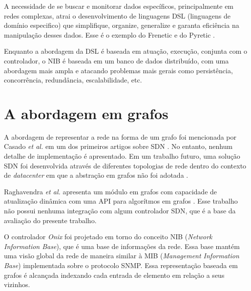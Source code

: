 A necessidade de se buscar e monitorar dados 
específicos, principalmente em redes complexas, atrai o desenvolvimento
de linguagens DSL (linguagens de domínio especifico) que simplifique, 
organize, generalize e garanta eficiência na manipulação desses dados.
Esse é o exemplo do Frenetic \citep{foster2011frenetic} 
e do Pyretic \citep{monsanto2013composing}.

Enquanto a abordagem da DSL é baseada em atuação, execução,
conjunta com o controlador,
o NIB é baseada em um banco de dados distribuído,
com uma abordagem mais ampla e atacando problemas mais gerais
como persistência, concorrência, redundância, escalabilidade, etc.

\section{A abordagem em grafos}

A abordagem de representar a rede na forma de um grafo foi mencionada 
por Casado \emph{et al.} em um dos primeiros artigos sobre SDN
\citep{martin2010virtualizing}.
No entanto, nenhum detalhe de implementação é apresentado.
Em um trabalho futuro, uma solução SDN foi desenvolvida através de 
diferentes topologias de rede dentro do contexto de \emph{datacenter} 
em que a abstração em grafos não foi adotada \citep{ripcord}. 

Raghavendra \emph{et al.} apresenta um módulo em grafos com capacidade 
de atualização dinâmica com uma API para algorítmos em grafos
\citep{ramya2012dynamic}.
Esse trabalho não possui nenhuma integração com algum controlador SDN,
que é a base da avaliação do presente trabalho.

O controlador \emph{Onix} \citep{teemu2010onix} foi projetado em torno do 
conceito NIB (\emph{Network Information Base}), que é uma base 
de informações da rede.
Essa base mantém uma visão global da rede de maneira similar à 
MIB (\emph{Management Information Base}) implementada sobre o
protocolo SNMP.
Essa representação baseada em grafos é alcançada indexando cada
entrada de elemento em relação a seus vizinhos.

